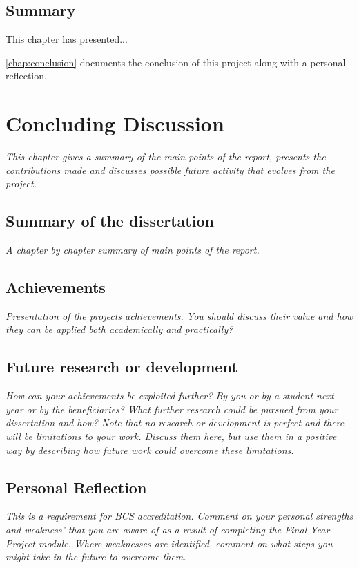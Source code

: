 \documentclass[final,a4paper,11pt]{report}
\begin{document}
\section{Summary}
This chapter has presented...

\autoref{chap:conclusion} documents the conclusion of this project along with a personal reflection.

\clearpage %

\chapter{Concluding Discussion}\label{chap:conclusion}
\textit{This chapter gives a summary of the main points of the report, presents the contributions made and discusses possible future activity that evolves from the project.}

\section{Summary of the dissertation}
\textit{A chapter by chapter summary of main points of the report.}

\section{Achievements}
\textit{Presentation of the projects achievements. You should discuss their value and how they can be applied both academically and practically?}

\section{Future research or development}
\textit{How can your achievements be exploited further? By you or by a student next year or by the beneficiaries? What further research could be pursued from your dissertation and how? Note that no research or development is perfect and there will be limitations to your work. Discuss them here, but use them in a positive way by describing how future work could overcome these limitations.}

\section{Personal Reflection}
\textit{This is a requirement for BCS accreditation. Comment on your personal strengths and weakness' that you are aware of as a result of completing the Final Year Project module. Where weaknesses are identified, comment on what steps you might take in the future to overcome them.}
\end{document}
